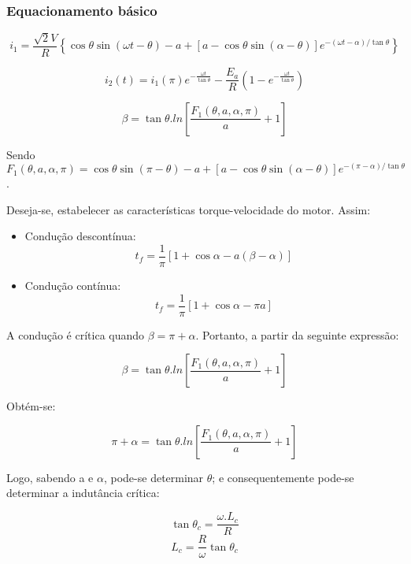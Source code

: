 \subsubsection{Equacionamento básico}

\[i_{1} = \frac{\sqrt{2}V}{R}\left\{\cos{\theta}\sin\left(\omega{t} - \theta\right) - a + \left[a - \cos{\theta}\sin{\left(\alpha - \theta\right)}\right]e^{-\left(\omega{t} - \alpha\right)/\tan{\theta}}\right\}\]

\[i_{2}(t) = i_{1}(\pi)e^{-\frac{\omega{t}}{\tan{\theta}}} - \frac{E_{a}}{R}\left(1 - e^{-\frac{\omega{t}}{\tan{\theta}}}\right)\]

\[\beta = \tan{\theta}.ln\left[\frac{F_{1}(\theta,a,\alpha,\pi)}{a} + 1\right]\]

Sendo $F_{1}(\theta,a,\alpha,\pi) = \cos{\theta}\sin\left(\pi - \theta\right) - a + \left[a - \cos{\theta}\sin{\left(\alpha - \theta\right)}\right]e^{-\left(\pi - \alpha\right)/\tan{\theta}} $.

Deseja-se, estabelecer as características torque-velocidade do motor. Assim:

\begin{itemize}
    \item Condução descontínua:
	\[t_{f} = \frac{1}{\pi}\left[1 + \cos{\alpha} - a(\beta - \alpha)\right]\]
    \item Condução contínua:
	\[t_{f} = \frac{1}{\pi}\left[1 + \cos{\alpha} - \pi{a}\right]\]
\end{itemize}

A condução é crítica quando $\beta = \pi + \alpha$. Portanto, a partir da seguinte expressão:

\[\beta = \tan{\theta}.ln\left[\frac{F_{1}(\theta,a,\alpha,\pi)}{a} + 1\right]\]

Obtém-se:

\[\pi + \alpha = \tan{\theta}.ln\left[\frac{F_{1}(\theta,a,\alpha,\pi)}{a} + 1\right]\]

Logo, sabendo a e $\alpha$, pode-se determinar $\theta$; e consequentemente pode-se determinar a indutância crítica:

\[\tan{\theta_{c}} = \frac{\omega.L_{c}}{R}\]
\[L_{c} = \frac{R}{\omega}\tan{\theta_{c}}\]

